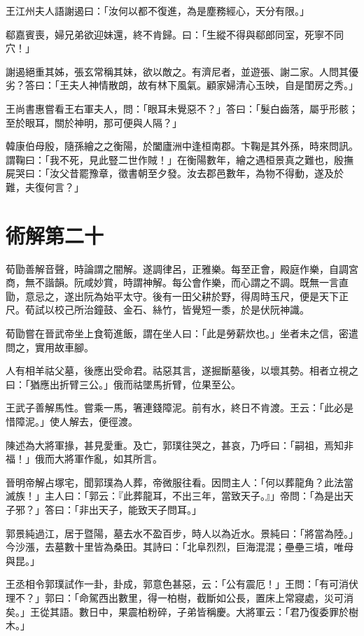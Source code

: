 王江州夫人語謝遏曰：「汝何以都不復進，為是塵務經心，天分有限。」

郗嘉賓喪，婦兄弟欲迎妹還，終不肯歸。曰：「生縱不得與郗郎同室，死寧不同穴！」

謝遏絕重其姊，張玄常稱其妹，欲以敵之。有濟尼者，並遊張、謝二家。人問其優劣？答曰：「王夫人神情散朗，故有林下風氣。顧家婦清心玉映，自是閨房之秀。」

王尚書惠嘗看王右軍夫人，問：「眼耳未覺惡不？」答曰：「髮白齒落，屬乎形骸；至於眼耳，關於神明，那可便與人隔？」

韓康伯母殷，隨孫繪之之衡陽，於闔廬洲中逢桓南郡。卞鞠是其外孫，時來問訊。謂鞠曰：「我不死，見此豎二世作賊！」在衡陽數年，繪之遇桓景真之難也，殷撫屍哭曰：「汝父昔罷豫章，徵書朝至夕發。汝去郡邑數年，為物不得動，遂及於難，夫復何言？」



\chapter{術解第二十}

荀勖善解音聲，時論謂之闇解。遂調律呂，正雅樂。每至正會，殿庭作樂，自調宮商，無不諧韻。阮咸妙賞，時謂神解。每公會作樂，而心謂之不調。既無一言直勖，意忌之，遂出阮為始平太守。後有一田父耕於野，得周時玉尺，便是天下正尺。荀試以校己所治鐘鼓、金石、絲竹，皆覺短一黍，於是伏阮神識。

荀勖嘗在晉武帝坐上食筍進飯，謂在坐人曰：「此是勞薪炊也。」坐者未之信，密遣問之，實用故車腳。

人有相羊祜父墓，後應出受命君。祜惡其言，遂掘斷墓後，以壞其勢。相者立視之曰：「猶應出折臂三公。」俄而祜墜馬折臂，位果至公。

王武子善解馬性。嘗乘一馬，箸連錢障泥。前有水，終日不肯渡。王云：「此必是惜障泥。」使人解去，便徑渡。

陳述為大將軍掾，甚見愛重。及亡，郭璞往哭之，甚哀，乃呼曰：「嗣祖，焉知非福！」俄而大將軍作亂，如其所言。

晉明帝解占塚宅，聞郭璞為人葬，帝微服往看。因問主人：「何以葬龍角？此法當滅族！」主人曰：「郭云：『此葬龍耳，不出三年，當致天子。』」帝問：「為是出天子邪？」答曰：「非出天子，能致天子問耳。」

郭景純過江，居于暨陽，墓去水不盈百步，時人以為近水。景純曰：「將當為陸。」今沙漲，去墓數十里皆為桑田。其詩曰：「北阜烈烈，巨海混混；壘壘三墳，唯母與昆。」

王丞相令郭璞試作一卦，卦成，郭意色甚惡，云：「公有震厄！」王問：「有可消伏理不？」郭曰：「命駕西出數里，得一柏樹，截斷如公長，置床上常寢處，災可消矣。」王從其語。數日中，果震柏粉碎，子弟皆稱慶。大將軍云：「君乃復委罪於樹木。」

